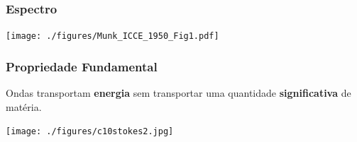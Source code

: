 \begin{frame}
    \frametitle{Espectro}
    \begin{center}
        \texttt{[image: ./figures/Munk\_ICCE\_1950\_Fig1.pdf]}
    \end{center}
\end{frame}

\begin{frame}
    \frametitle{Propriedade Fundamental}
    \begin{block}{}
        Ondas transportam {\bf energia} sem transportar uma quantidade
        {\bf significativa} de matéria.
    \end{block}
    \begin{center}
        \texttt{[image: ./figures/c10stokes2.jpg]}
    \end{center}
\end{frame}

